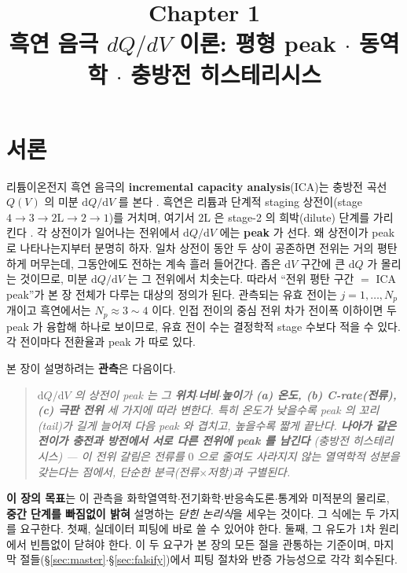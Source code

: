 \documentclass[11pt,a4paper]{article}
\title{\textbf{\LARGE Chapter 1}\\[0.35em]\Large 흑연 음극 $dQ/dV$ 이론: 평형 peak $\cdot$ 동역학 $\cdot$ 충방전 히스테리시스}
\author{}
\date{}
\newcommand{\dd}{\mathrm{d}}
\begin{document}
\maketitle

\section*{서론}
리튬이온전지 흑연 음극의 \textbf{incremental capacity analysis}(ICA)는 충방전 곡선 $Q(V)$ 의 미분
$\dd Q/\dd V$ 를 본다 \cite{bloom2005,dubarry2012}. 흑연은 리튬과 단계적 staging 상전이(stage
$4\!\to\!3\!\to\!2\mathrm L\!\to\!2\!\to\!1$)를 거치며, 여기서 $2\mathrm L$ 은 stage-2 의 희박(dilute) 단계를
가리킨다 \cite{dahn1991,ohzuku1993,funabiki1999}. 각 상전이가 일어나는 전위에서 $\dd Q/\dd V$ 에는 \textbf{peak}
가 선다. 왜 상전이가 peak 로 나타나는지부터 분명히 하자. 일차 상전이 동안 두 상이 공존하면 전위는 거의 평탄하게
머무는데, 그동안에도 전하는 계속 흘러 들어간다. 좁은 $\dd V$ 구간에 큰 $\dd Q$ 가 몰리는 것이므로, 미분
$\dd Q/\dd V$ 는 그 전위에서 치솟는다. 따라서 ``전위 평탄 구간 $=$ ICA peak''가 본 장 전체가 다루는 대상의
정의가 된다. 관측되는 유효 전이는 $j=1,\dots,N_p$ 개이고 흑연에서는 $N_p\approx3\sim4$ 이다. 인접 전이의 중심
전위 차가 전이폭 이하이면 두 peak 가 융합해 하나로 보이므로, 유효 전이 수는 결정학적 stage 수보다 적을 수 있다.
각 전이마다 전환율과 peak 가 따로 있다.

본 장이 설명하려는 \textbf{관측}은 다음이다.
\begin{quote}\itshape
$\dd Q/\dd V$ 의 상전이 peak 는 그 \textbf{위치$\cdot$너비$\cdot$높이}가 \textbf{(a) 온도, (b) C-rate(전류),
(c) 극판 전위} 세 가지에 따라 변한다. 특히 \emph{온도가 낮을수록 peak 의 꼬리(tail)가 길게 늘어져 다음 peak
와 겹치고}, 높을수록 짧게 끝난다. \textbf{나아가 같은 전이가 충전과 방전에서 서로 다른 전위에 peak 를 남긴다}
(\emph{충방전 히스테리시스}) — 이 전위 갈림은 전류를 $0$ 으로 줄여도 \emph{사라지지 않는} 열역학적 성분을 갖는다는
점에서, 단순한 분극(전류$\times$저항)과 구별된다.
\end{quote}

\textbf{이 장의 목표}는 이 관측을 화학열역학$\cdot$전기화학$\cdot$반응속도론$\cdot$통계와 미적분의 물리로,
\textbf{중간 단계를 빠짐없이 밝혀} 설명하는 \emph{닫힌 논리식}을 세우는 것이다. 그 식에는 두 가지를 요구한다.
첫째, 실데이터 피팅에 바로 쓸 수 있어야 한다. 둘째, 그 유도가 1차 원리에서 빈틈없이 닫혀야 한다. 이 두 요구가
본 장의 모든 절을 관통하는 기준이며, 마지막 절들(\S\ref{sec:master}$\cdot$\S\ref{sec:falsify})에서 피팅 절차와
반증 가능성으로 각각 회수된다.
\end{document}
